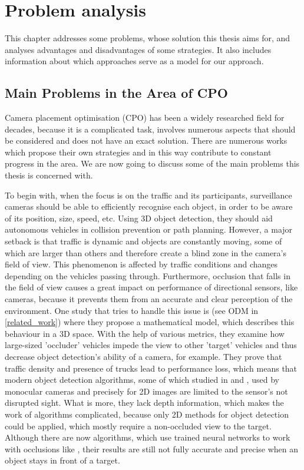 \chapter{Problem analysis} \label{problem_analysis}
This chapter addresses some problems, whose solution this thesis aims for, and analyses advantages and disadvantages of some strategies. It also includes information about which approaches serve as a model for our approach.

\section{Main Problems in the Area of CPO} \label{main_problems}
Camera placement optimisation (CPO) has been a widely researched field for decades, because it is a complicated task, involves numerous aspects that should be considered and does not have an exact solution. There are numerous works which propose their own strategies and in this way contribute to constant progress in the area. We are now going to discuss some of the main problems this thesis is concerned with.

To begin with, when the focus is on the traffic and its participants, surveillance cameras should be able to efficiently recognise each object, in order to be aware of its position, size, speed, etc. Using 3D object detection, they should aid autonomous vehicles in collision prevention or path planning. However, a major setback is that traffic is dynamic and objects are constantly moving, some of which are larger than others and therefore create a blind zone in the camera's field of view. This phenomenon is affected by traffic conditions and changes depending on the vehicles passing through. Furthermore, occlusion that falls in the field of view causes a great impact on performance of directional sensors, like cameras, because it prevents them from an accurate and clear perception of the environment. One study that tries to handle this issue is \cite{occlusion_degree_model} (see ODM in \ref{related_work}) where they propose a mathematical model, which describes this behaviour in a 3D space. With the help of various metrics, they examine how large-sized 'occluder' vehicles impede the view to other 'target' vehicles and thus decrease object detection's ability of a camera, for example. They prove that traffic density and presence of trucks lead to performance loss, which means that modern object detection algorithms, some of which studied in \cite{camera_vs_lidar} and \cite{object_detection_list}, used by monocular cameras and precisely for 2D images are limited to the sensor's not disrupted sight. What is more, they lack depth information, which makes the work of algorithms complicated, because only 2D methods for object detection could be applied, which mostly require a non-occluded view to the target. Although there are now algorithms, which use trained neural networks to work with occlusions like \cite{object_detection_alg}, their results are still not fully accurate and precise when an object stays in front of a target.


